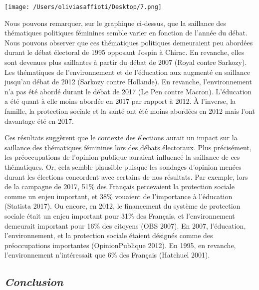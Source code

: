 \documentclass[
  letterpaper,
  DIV=11,
  numbers=noendperiod]{scrartcl}
\begin{document}
\texttt{[image: /Users/oliviasaffioti/Desktop/7.png]}

Nous pouvons remarquer, sur le graphique ci-dessus, que la saillance des
thématiques politiques féminines semble varier en fonction de l'année du
débat. Nous pouvons observer que ces thématiques politiques demeuraient
peu abordées durant le débat électoral de 1995 opposant Jospin à Chirac.
En revanche, elles sont devenues plus saillantes à partir du débat de
2007 (Royal contre Sarkozy). Les thématiques de l'environnement et de
l'éducation aux augmenté en saillance jusqu'au débat de 2012 (Sarkozy
contre Hollande). En revanche, l'environnement n'a pas été abordé durant
le débat de 2017 (Le Pen contre Macron). L'éducation a été quant à elle
moins abordée en 2017 par rapport à 2012. À l'inverse, la famille, la
protection sociale et la santé ont été moins abordées en 2012 mais l'ont
davantage été en 2017.

Ces résultats suggèrent que le contexte des élections aurait un impact
sur la saillance des thématiques féminines lors des débats électoraux.
Plus précisément, les préoccupations de l'opinion publique auraient
influencé la saillance de ces thématiques. Or, cela semble plausible
puisque les sondages d'opinion menées durant les élections concordent
avec certains de nos résultats. Par exemple, lors de la campagne de
2017, 51\% des Français percevaient la protection sociale comme un enjeu
important, et 38\% vouaient de l'importance à l'éducation (Statista
2017). Ou encore, en 2012, le financement du système de protection
sociale était un enjeu important pour 31\% des Français, et
l'environnement demeurait important pour 16\% des citoyens (OBS 2007).
En 2007, l'éducation, l'environnement, et la protection sociale étaient
désignés comme des préoccupations importantes (OpinionPublique 2012). En
1995, en revanche, l'environnement n'intéressait que 6\% des Français
(Hatchuel 2001).

\hypertarget{conclusion}{%
\subsection{\texorpdfstring{\emph{Conclusion}}{Conclusion}}\label{conclusion}}
\end{document}
